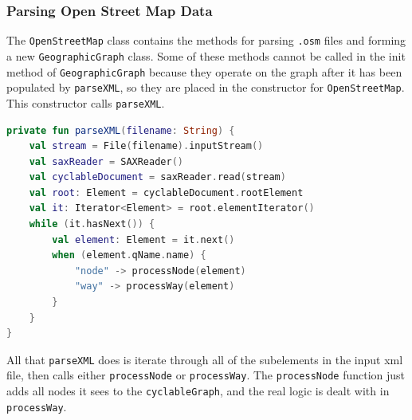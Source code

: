 \documentclass[11pt,twoside,a4paper]{article}
\begin{document}
\subsubsection{Parsing Open Street Map Data}
The \texttt{OpenStreetMap} class contains the methods for parsing \texttt{.osm} files and forming a new \texttt{GeographicGraph} class. Some of these methods cannot be called in the init method of \texttt{GeographicGraph} because 
they operate on the graph after it has been populated by \texttt{parseXML}, so they are placed in the constructor for \texttt{OpenStreetMap}. This constructor calls \texttt{parseXML}.
\begin{lstlisting}[language=kotlin]
private fun parseXML(filename: String) {
    val stream = File(filename).inputStream()
    val saxReader = SAXReader()
    val cyclableDocument = saxReader.read(stream)
    val root: Element = cyclableDocument.rootElement
    val it: Iterator<Element> = root.elementIterator()
    while (it.hasNext()) {
        val element: Element = it.next()
        when (element.qName.name) {
            "node" -> processNode(element)
            "way" -> processWay(element)
        }
    }
}
\end{lstlisting}
All that \texttt{parseXML} does is iterate through all of the subelements in the input xml file, then calls either \texttt{processNode} or \texttt{processWay}. The \texttt{processNode} function just adds all nodes it sees to the \texttt{cyclableGraph}, and the real logic is dealt with in \texttt{processWay}.
\end{document}
